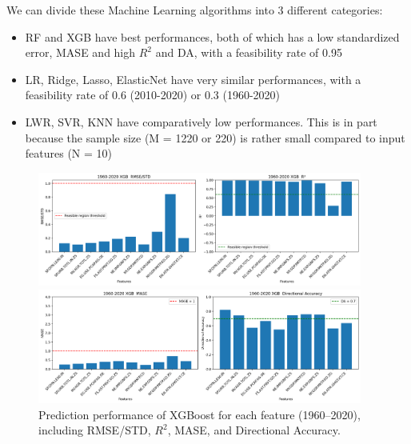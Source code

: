 \documentclass[12pt]{article}
\begin{document}
We can divide these Machine Learning algorithms into 3 different categories: 
\begin{itemize}
\item RF and XGB have best performances, both of which has a low standardized error, MASE and high $R^2$ and DA, with a feasibility rate of 0.95
\item LR, Ridge, Lasso, ElasticNet have very similar performances, with a feasibility rate of 0.6 (2010-2020) or 0.3 (1960-2020)
\item LWR, SVR, KNN have comparatively low performances. This is in part because the sample size (M = 1220 or 220) is rather small compared to input features (N = 10)
\end{itemize}

\begin{figure}[h]
    \centering
    \includegraphics[width=0.95\textwidth]{1960_2020_XGB.png}
    
    \vspace{1em}  %

    \includegraphics[width=0.95\textwidth]{1960_2020_XGB_mase_da.png}
    
    \caption{Prediction performance of XGBoost for each feature (1960--2020), including RMSE/STD, $R^2$, MASE, and Directional Accuracy.}
    \label{fig:xgb_feature_summary}
\end{figure}
\end{document}
